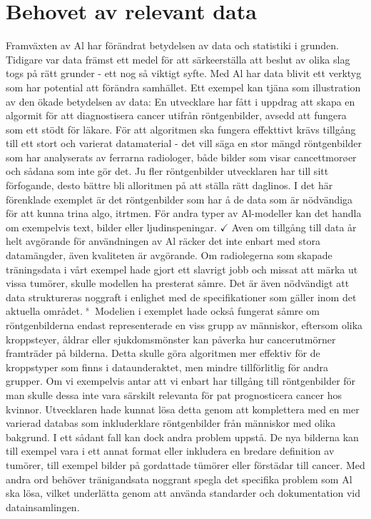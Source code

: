 {{{{\section*{Behovet av relevant data}
Framväxten av Al har förändrat betydelsen av data och statistiki i grunden. Tidigare var data främst ett medel för att särkeerställa att beslut av olika slag togs på rätt grunder - ett nog så viktigt syfte. Med Al har data blivit ett verktyg som har potential att förändra samhället.
Ett exempel kan tjäna som illustration av den ökade betydelsen av data: En utvecklare har fått i uppdrag att skapa en algormit för att diagnostisera cancer utifrån röntgenbilder, avsedd att fungera som ett stödt för läkare. För att algoritmen ska fungera effekttivt krävs tillgång till ett stort och varierat datamaterial - det vill säga en stor mängd röntgenbilder som har analyserats av ferrarna radiologer, både bilder som visar cancettmorøer och sådana som inte gör det. Ju fler röntgenbilder utvecklaren har till sitt förfogande, desto bättre bli alloritmen på att ställa rätt daglinos. I det här förenklade exemplet är det röntgenbilder som har å de data som är nödvändiga för att kunna trina algo, itrtmen. För andra typer av Al-modeller kan det handla om exempelvis text, bilder eller ljudinspeningar.
\(\checkmark\) Aven om tillgång till data år helt avgörande för användningen av Al räcker det inte enbart med stora datamängder, även kvaliteten är avgörande. Om radiolegerna som skapade träningsdata i vårt exempel hade gjort ett slavrigt jobb och missat att märka ut vissa tumörer, skulle modellen ha presterat såmre. Det är även nödvändigt att data struktureras noggraft
i enlighet med de specifikationer som gäller inom det aktuella området. \({ }^{\text {s }}\)
Modelien i exemplet hade också fungerat såmre om röntgenbilderna endast representerade en viss grupp av människor, eftersom olika kroppsteyer, åldrar eller sjukdomsmönster kan påverka hur cancerutmörner framträder på bilderna. Detta skulle göra algoritmen mer effektiv för de kroppstyper som finns i dataunderaktet, men mindre tillförlitlig för andra grupper. Om vi exempelvis antar att vi enbart har tillgång till röntgenbilder för man skulle dessa inte vara särskilt relevanta för pat prognosticera cancer hos kvinnor.
Utvecklaren hade kunnat lösa detta genom att komplettera med en mer varierad databas som inkluderklare röntgenbilder från människor med olika bakgrund. I ett sådant fall kan dock andra problem uppstå. De nya bilderna kan till exempel vara i ett annat format eller inkludera en bredare definition av tumörer, till exempel bilder på gordattade tümörer eller förstädar till cancer. Med andra ord behöver tränigandsata noggrant spegla det specifika problem som Al ska lösa, vilket underlätta genom att använda standarder och dokumentation vid datainsamlingen.

}}}}
